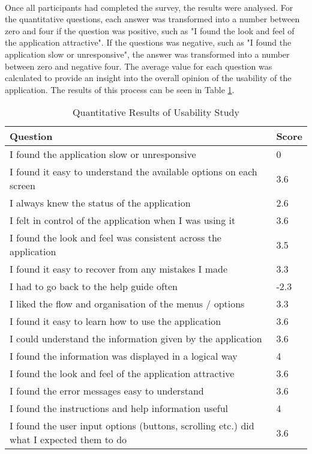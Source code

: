 {	\paragraph{}{
	Once all participants had completed the survey, the results were analysed. For the quantitative questions, each answer was transformed into a number between zero and four if the question was positive, such as "I found the look and feel of the application attractive". If the questions was negative, such as "I found the application slow or unresponsive", the answer was transformed into a number between zero and negative four. The average value for each question was calculated to provide an insight into the overall opinion of the usability of the application. The results of this process can be seen in Table \ref{tab:UsabilityScores}.
	
	\begin{table}[ht]
		\begin{center}				
			\begin{tabularx}{\textwidth}{| X | l |}
				\hline
				\textbf{Question} & \textbf{Score}\\
				\hline
				I found the application slow or unresponsive & 0\\
				\hline
				I found it easy to understand the available options on each screen & 3.6\\
				\hline
				I always knew the status of the application & 2.6\\
				\hline
				I felt in control of the application when I was using it & 3.6\\
				\hline
				I found the look and feel was consistent across the application & 3.5\\
				\hline
				I found it easy to recover from any mistakes I made & 3.3\\
				\hline
				I had to go back to the help guide often & -2.3\\
				\hline
				I liked the flow and organisation of the menus / options & 3.3\\
				\hline
				I found it easy to learn how to use the application & 3.6\\
				\hline
				I could understand the information given by the application & 3.6\\
				\hline
				I found the information was displayed in a logical way & 4\\
				\hline
				I found the look and feel of the application attractive & 3.6\\
				\hline
				I found the error messages easy to understand & 3.6\\
				\hline
				I found the instructions and help information useful & 4\\
				\hline
				I found the user input options (buttons, scrolling etc.) did what I expected them to do & 3.6\\
				\hline
			\end{tabularx}
			\caption{Quantitative Results of Usability Study}
			\label{tab:UsabilityScores}
		\end{center}
	\end{table}
	
}}
